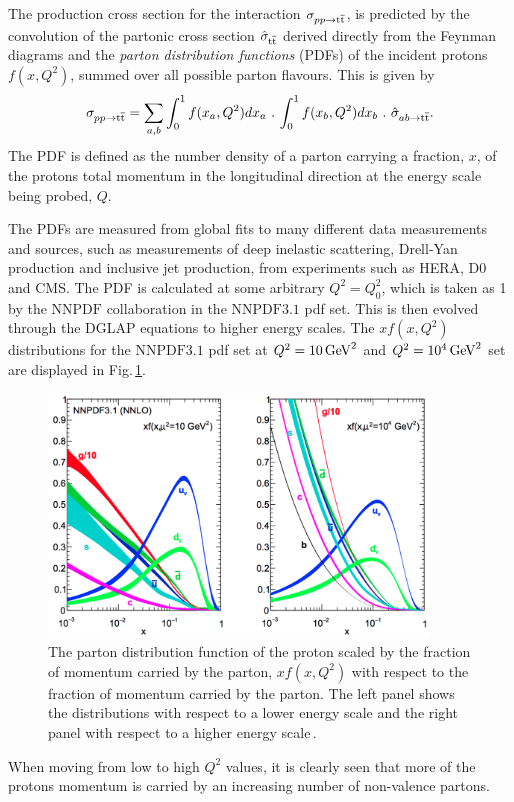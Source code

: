 The production cross section for the interaction $\sigma_{pp\to\mathrm{t}\overline{\mathrm{t}}{}}$, is predicted by the convolution of the partonic cross section $\hat{\sigma}_{\mathrm{t}\overline{\mathrm{t}}{}}$ derived directly from the Feynman diagrams and the \textit{parton distribution functions} (PDFs) of the incident protons $f(x, Q^{2})$, summed over all possible parton flavours.
This is given by
\begin{equation}
\label{eq:pdf}
	\sigma_{pp\to\mathrm{t}\overline{\mathrm{t}}{}} = \sum_{a, b}\int_{0}^{1}f(x_{a}, Q^{2})dx_{a}\,\,.\,\int_{0}^{1}f(x_{b}, Q^{2})dx_{b}\,\,.\,\,\hat{\sigma}_{ab\to\mathrm{t}\overline{\mathrm{t}}{}}.
\end{equation}
The PDF is defined as the number density of a parton carrying a fraction, $x$, of the protons total momentum in the longitudinal direction at the energy scale being probed, $Q$.

The PDFs are measured from global fits to many different data measurements and sources, such as measurements of deep inelastic scattering, Drell-Yan production and inclusive jet production, from experiments such as HERA, D0 and CMS.
The PDF is calculated at some arbitrary $Q^{2} = Q^{2}_{0}$, which is taken as 1\GeV{} by the $\mathrm{NNPDF}$ collaboration in the $\mathrm{NNPDF3.1}$ pdf set.
This is then evolved through the DGLAP equations to higher energy scales.
The $xf(x, Q^{2})$ distributions for the $\mathrm{NNPDF3.1}$ pdf set at $Q^{2} = 10\,\text{Ge\hspace{-.08em}V}^{2}$ and $Q^{2} = 10^{4}\,\text{Ge\hspace{-.08em}V}^{2}$ set are displayed in Fig.\,\ref{fig:pdf}.
\begin{figure}[htpb]
	\centering
	\includegraphics[width=0.9\textwidth]{Figures/PDF}
	\caption[The parton distribution function of the proton scaled by the fraction of momentum carried by the parton, $xf(x, Q^2)$ with respect to the fraction of momentum carried by the parton. The left panel shows the distributions with respect to a lower energy scale and the right panel with respect to a higher energy scale.]{ The parton distribution function of the proton scaled by the fraction of momentum carried by the parton, $xf(x, Q^2)$ with respect to the fraction of momentum carried by the parton. The left panel shows the distributions with respect to a lower energy scale and the right panel with respect to a higher energy scale\,\cite{NNPDF3p1}. }
	\label{fig:pdf}
\end{figure}
When moving from low to high $Q^{2}$ values, it is clearly seen that more of the protons momentum is carried by an increasing number of non-valence partons.

